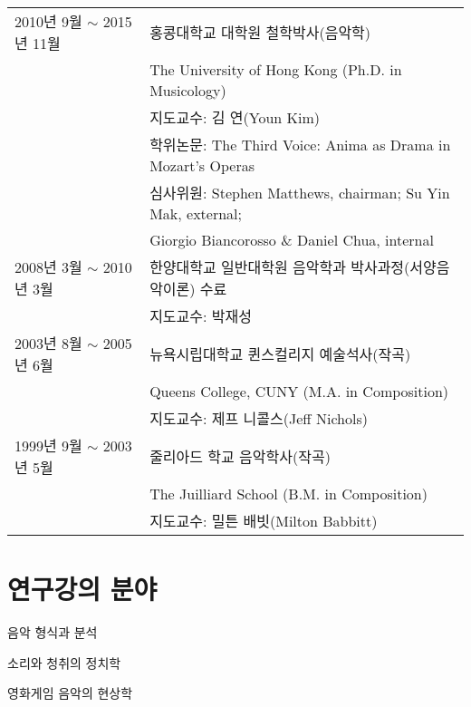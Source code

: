 \documentclass[dvipdfmx,a4paper]{article}
\begin{document}
  \hspace*{-0.25cm}
  \begin{tabular}{p{4.0cm} p{10.0cm}}
    2010년 9월 $\sim$ 2015년 11월 & 홍콩대학교 대학원 철학박사(음악학)\\
    & The University of Hong Kong (Ph.D. in Musicology)\\
    & 지도교수: 김 연(Youn Kim)\\
    & 학위논문: The Third Voice: Anima as Drama in Mozart’s Operas\\
    & 심사위원: Stephen Matthews, chairman; Su Yin Mak, external;\\
    & \hspace*{14mm} Giorgio Biancorosso \& Daniel Chua, internal\\[2mm]
    
    2008년 3월 $\sim$ 2010년 3월 & 한양대학교 일반대학원 음악학과 박사과정(서양음악이론) 수료\\
    & 지도교수: 박재성\\[2mm]
    
	2003년 8월 $\sim$ 2005년 6월 & 뉴욕시립대학교 퀸스컬리지 예술석사(작곡)\\
    & Queens College, CUNY (M.A. in Composition)\\
	& 지도교수: 제프 니콜스(Jeff Nichols)\\[2mm]

    1999년 9월 $\sim$ 2003년 5월 & 줄리아드 학교 음악학사(작곡)\\
    & The Juilliard School (B.M. in Composition)\\
    & 지도교수: 밀튼 배빗(Milton Babbitt)
  \end{tabular}
  
  \vspace{5mm}
  
  \section*{\normalsize 연구\textperiodcentered 강의 분야}
  
  \noindent \hspace{2mm} \textbullet \hspace{2mm} 음악 형식과 분석
  
  \noindent \hspace{2mm} \textbullet \hspace{2mm} 소리와 청취의 정치학
  
  \noindent \hspace{2mm} \textbullet \hspace{2mm} 영화\textperiodcentered 게임 음악의 현상학
  
\end{document}
